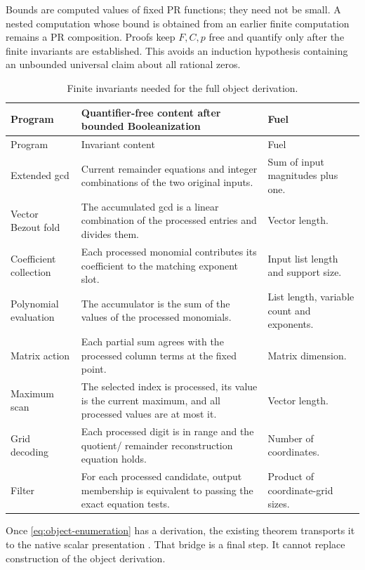 Bounds are computed values of fixed PR functions; they need not be
small. A nested computation whose bound is obtained from an earlier
finite computation remains a PR composition. Proofs keep $F,C,p$
free and quantify only after the finite invariants are established.
This avoids an induction hypothesis containing an unbounded universal
claim about all rational zeros.

\begin{longtable}{P{.22\linewidth}P{.43\linewidth}P{.25\linewidth}}
\caption{Finite invariants needed for the full object derivation.}
\label{tab:invariants}\\
\toprule
Program & Quantifier-free content after bounded Booleanization & Fuel\\
\midrule\endfirsthead
\toprule Program & Invariant content & Fuel\\\midrule\endhead
Extended gcd & Current remainder equations and integer combinations
of the two original inputs. & Sum of input magnitudes plus one.\\[3pt]
Vector Bezout fold & The accumulated gcd is a linear combination of
the processed entries and divides them. & Vector length.\\[3pt]
Coefficient collection & Each processed monomial contributes its
coefficient to the matching exponent slot. & Input list length and
support size.\\[3pt]
Polynomial evaluation & The accumulator is the sum of the values of
the processed monomials. & List length, variable count and exponents.\\[3pt]
Matrix action & Each partial sum agrees with the processed column
terms at the fixed point. & Matrix dimension.\\[3pt]
Maximum scan & The selected index is processed, its value is the
current maximum, and all processed values are at most it. & Vector
length.\\[3pt]
Grid decoding & Each processed digit is in range and the quotient/
remainder reconstruction equation holds. & Number of coordinates.\\[3pt]
Filter & For each processed candidate, output membership is equivalent
to passing the exact equation tests. & Product of coordinate-grid sizes.\\
\bottomrule
\end{longtable}

Once \eqref{eq:object-enumeration} has a 
derivation, the existing theorem  transports
it to the native scalar presentation \cite{NativeSource}. That bridge
is a final step. It cannot replace construction of the object derivation.

